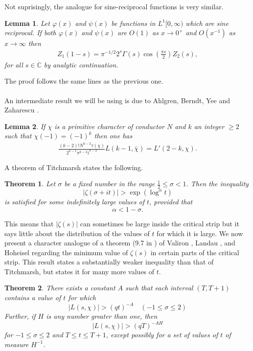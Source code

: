 \documentclass[11pt]{article}
\newtheorem{lemma}{Lemma}[section]
\newtheorem{theorem}{Theorem}[section]
\newcommand{\C}{\mathbb{C}}
\numberwithin{equation}{section}		 			%
\numberwithin{figure}{section}			 			%
\begin{document}
\noindent Not suprisingly, the analogue for sine-reciprocal functions is very similar.
\begin{lemma}
Let $\varphi(x)$ and $\psi(x)$ be functions in $L^1[0,\infty)$ which are sine reciprocal. If both $\varphi(x)$ and $\psi(x)$ are $O(1)$ as $x \to 0^+$ and $O(x^{-1})$ as $x \to \infty$ then
\begin{align} \label{FEsine}
{Z_1}(1 - s) = {\pi ^{ - 1/2}}{2^s}\Gamma (s)\cos \left( {\frac{{\pi s}}{2}} \right){Z_2}(s),
\end{align}
for all $s \in \C$ by analytic continuation.
\end{lemma}
\noindent The proof follows the same lines as the previous one.\\\\
\noindent An intermediate result we will be using is due to Ahlgren, Berndt, Yee and Zaharescu \cite{abyz}.
\begin{lemma} \label{ABYC}
If $\chi$ is a primitive character of conductor $N$ and $k$ an integer $\ge 2$ such that $\chi(-1)=(-1)^k$ then one has
\begin{align} \label{6_1}
\frac{{(k - 2)!N^{k - 2} \tau (\chi )}}{{2^{k - 1} \pi ^{k - 2} i^{k - 2} }}L(k - 1,\bar \chi ) = L'(2 - k,\chi ).
\end{align}
\end{lemma}
\noindent A theorem of Titchmarsh \cite{titchmarsh4} states the following.
\begin{theorem}
Let $\sigma$ be a fixed number in the range $\tfrac{1}{2} \le \sigma < 1$. Then the inequality
\[\left| {\zeta (\sigma  + it)} \right| > \exp ({\log ^\alpha }t)\]
is satisfied for some indefinitely large values of $t$, provided that
\[
\alpha < 1 - \sigma.
\]
\end{theorem}
\noindent This means that $\left| {\zeta (s)} \right|$ can sometimes be large inside the critical strip but it says little about the distribution of the values of $t$ for which it is large. We now present a character analogue of a theorem (9.7 in \cite{titchmarsh}) of Valiron \cite{valiron}, Landau \cite{landau_8}, \cite{landau_18} and Hoheisel \cite{hoheisel_3} regarding the minimum value of $\zeta(s)$ in certain parts of the critical strip. This result states a substantially weaker inequality than that of Titchmarsh, but states it for many more values of $t$.
\begin{theorem}
There exists a constant $A$ such that each interval $(T,T+1)$ contains a value of $t$ for which
\[
\left| {L(s,\chi )} \right| > (qt)^{ - A} \quad ( - 1 \leqslant \sigma  \leqslant 2)
\]
Further, if $H$ is any number greater than one, then
\[
\left| {L(s,\chi )} \right| > (qT)^{ - AH} 
\]
for $- 1 \leqslant \sigma  \leqslant 2$ and $T \le t \le T+1$, except possibly for a set of values of $t$ of measure $H^{-1}$.
\end{theorem}
\end{document}
